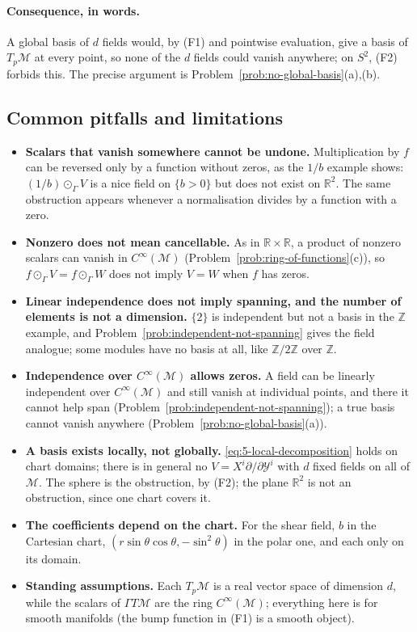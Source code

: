 \documentclass[11pt]{article}
\newcommand{\TpM}{T_p\mathcal M}
\newcommand{\Cinf}{C^\infty(\mathcal M)}
\begin{document}
\paragraph{Consequence, in words.} A global basis of $d$ fields would, by (F1) and pointwise evaluation, give a basis of $\TpM$ at every point, so none of the $d$ fields could vanish anywhere; on $S^2$, (F2) forbids this. The precise argument is Problem~\ref{prob:no-global-basis}(a),(b).

\subsection*{Common pitfalls and limitations}

\begin{itemize}
  \item \textbf{Scalars that vanish somewhere cannot be undone.} Multiplication by $f$ can be reversed only by a function without zeros, as the $1/b$ example shows: $(1/b)\odot_\Gamma V$ is a nice field on $\{b>0\}$ but does not exist on $\mathbb R^2$. The same obstruction appears whenever a normalisation divides by a function with a zero.
  \item \textbf{Nonzero does not mean cancellable.} As in $\mathbb R\times\mathbb R$, a product of nonzero scalars can vanish in $\Cinf$ (Problem~\ref{prob:ring-of-functions}(c)), so $f\odot_\Gamma V=f\odot_\Gamma W$ does not imply $V=W$ when $f$ has zeros.
  \item \textbf{Linear independence does not imply spanning, and the number of elements is not a dimension.} $\{2\}$ is independent but not a basis in the $\mathbb Z$ example, and Problem~\ref{prob:independent-not-spanning} gives the field analogue; some modules have no basis at all, like $\mathbb Z/2\mathbb Z$ over $\mathbb Z$.
  \item \textbf{Independence over $\Cinf$ allows zeros.} A field can be linearly independent over $\Cinf$ and still vanish at individual points, and there it cannot help span (Problem~\ref{prob:independent-not-spanning}); a true basis cannot vanish anywhere (Problem~\ref{prob:no-global-basis}(a)).
  \item \textbf{A basis exists locally, not globally.} \eqref{eq:5-local-decomposition} holds on chart domains; there is in general no $V=X^i\partial/\partial\mathcal Y^i$ with $d$ fixed fields on all of $\mathcal M$. The sphere is the obstruction, by (F2); the plane $\mathbb R^2$ is not an obstruction, since one chart covers it.
  \item \textbf{The coefficients depend on the chart.} For the shear field, $b$ in the Cartesian chart, $(r\sin\theta\cos\theta,-\sin^2\theta)$ in the polar one, and each only on its domain.
  \item \textbf{Standing assumptions.} Each $\TpM$ is a real vector space of dimension $d$, while the scalars of $\Gamma T\mathcal M$ are the ring $\Cinf$; everything here is for smooth manifolds (the bump function in (F1) is a smooth object).
\end{itemize}
\end{document}
